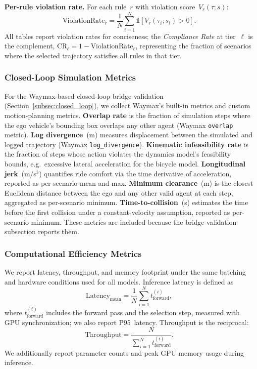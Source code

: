 \textbf{Per-rule violation rate.}
For each rule~$r$ with violation score~$V_r(\tau; s)$:
\begin{equation}
\text{ViolationRate}_r
= \frac{1}{N} \sum_{i=1}^{N} \mathbb{1}\!\left[V_r(\tau_i; s_i) > 0\right].
\end{equation}
\noindent All tables report violation rates for conciseness; the \emph{Compliance Rate} at tier~$\ell$ is the complement, $\text{CR}_\ell = 1 - \text{ViolationRate}_\ell$, representing the fraction of scenarios where the selected trajectory satisfies all rules in that tier.

\subsubsection{Closed-Loop Simulation Metrics}
\label{subsubsec:closed_loop_metrics}

For the Waymax-based closed-loop bridge validation (Section~\ref{subsec:closed_loop}), we collect Waymax's built-in metrics and custom motion-planning metrics. \textbf{Overlap rate} is the fraction of simulation steps where the ego vehicle's bounding box overlaps any other agent (Waymax \texttt{overlap} metric). \textbf{Log divergence}~(m) measures displacement between the simulated and logged trajectory (Waymax \texttt{log\_divergence}). \textbf{Kinematic infeasibility rate} is the fraction of steps whose action violates the dynamics model's feasibility bounds, e.g.\ excessive lateral acceleration for the bicycle model. \textbf{Longitudinal jerk}~(m/s$^3$) quantifies ride comfort via the time derivative of acceleration, reported as per-scenario mean and max. \textbf{Minimum clearance}~(m) is the closest Euclidean distance between the ego and any other valid agent at each step, aggregated as per-scenario minimum. \textbf{Time-to-collision}~(s) estimates the time before the first collision under a constant-velocity assumption, reported as per-scenario minimum.  These metrics are included because the bridge-validation subsection reports them.

\subsubsection{Computational Efficiency Metrics}

We report latency, throughput, and memory footprint under the same batching and hardware conditions used for all models.  Inference latency is defined as
\begin{equation}
\text{Latency}_{\text{mean}} = \frac{1}{N} \sum_{i=1}^{N} t_{\text{forward}}^{(i)},
\end{equation}
where $t_{\text{forward}}^{(i)}$ includes the forward pass and the selection step, measured with GPU synchronization; we also report P95~latency. Throughput is the reciprocal:
\begin{equation}
\text{Throughput} = \frac{N}{\sum_{i=1}^{N} t_{\text{forward}}^{(i)}}.
\end{equation}
We additionally report parameter counts and peak GPU memory usage during inference.

